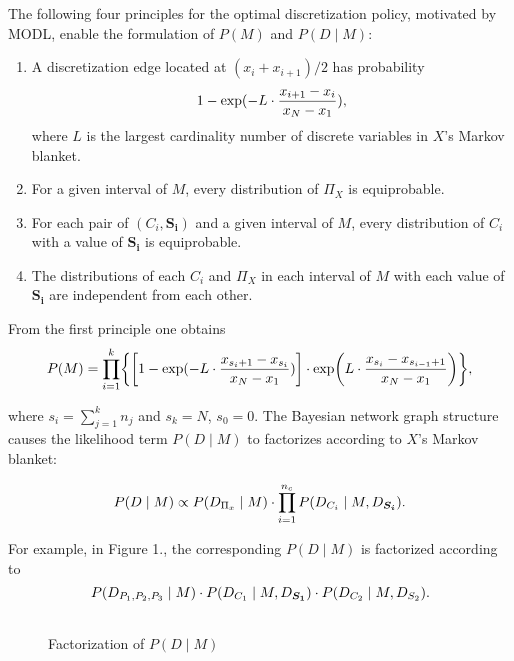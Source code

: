 The following four principles for the optimal discretization policy, motivated by MODL, enable the formulation of $P(M)$ and $P(D \mid M)$:
\begin{enumerate}
\item A discretization edge located at $(x_i + x_{i+1})/2$ has probability
\begin{equation}
1 - {\exp(- L \cdot {{x_{i+1} - x_i}\over{x_N - x_1}})},
\end{equation}
where $L$ is the largest cardinality number of discrete variables in $X$'s Markov blanket. \mykel{$\bigstar$}
\item For a given interval of $M$, every distribution of $\Pi_X$ is equiprobable.
\item For each pair of $(C_i,\boldsymbol{S_i})$ and a given interval of $M$, every distribution of $C_i$ with a value of $\boldsymbol{S_i}$ is equiprobable.\mykel{$\bigstar$}
\item The distributions of each $C_i$ and $\Pi_X$ in each interval of $M$ with each value of $\boldsymbol{S_i}$ are independent from each other.\mykel{$\bigstar$}
\end{enumerate}

From the first principle one obtains
\begin{equation}
\label{eq:p_M}
P(M) = \prod_{i=1}^k \curly{ \brock{1 - {\exp(- L \cdot {{x_{s_i+1} - x_{s_i}}\over{x_N - x_1}})}} \cdot \exp\paren{L \cdot {{x_{s_{i}} - x_{s_{i-1} + 1}}\over{x_N - x_1}}}},
\end{equation}

\noindent
where $s_i = \sum_{j=1}^k n_j$ and $s_k = N$, $s_0 = 0$.
The Bayesian network graph structure causes the likelihood term $P(D \mid M)$ to factorizes according to $X$'s Markov blanket:

\begin{equation}
\label{eq:p_D_given_M}
P\paren{D \mid M} \propto P\paren{D_{\Pi_x} \mid M} \cdot \prod_{i = 1}^{n_c} P\paren{D_{C_i} \mid M, D_{\boldsymbol{S_i}}}\text{.}
\end{equation}

For example, in Figure 1., the corresponding $P(D \mid M)$ is factorized according to
\begin{equation}
P\paren{D_{ P_1,P_2,P_3 } \mid M} \cdot P\paren{ D_{ C_1 } \mid M,D_{\boldsymbol{S_1}}} \cdot P\paren{D_{C_2} \mid M,D_{ S_2  }}\text{.}
\end{equation}

\begin{figure}[ht]
    \begin{tabular}{cc}
      
    \end{tabular}
  \caption{Factorization of $P(D \mid M)$}
\end{figure}


